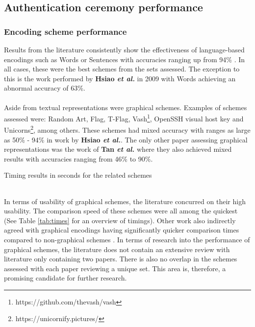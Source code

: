 \subsection{Authentication ceremony performance}

\subsubsection*{Encoding scheme performance}
Results 
from the literature consistently show the effectiveness of language-based encodings such as Words or Sentences with accuracies ranging up from 94\% \cite{dechand2016empirical}\cite{tan2017can}\cite{kainda2009usability}. In all cases, these were the best schemes from the sets assessed. The exception to this is the work performed by \textbf{Hsiao \textit{et al.}}\cite{hsiao2009study} in 2009 with Words achieving an abnormal accuracy of 63\%.
\\\\
Aside from textual representations were graphical schemes. Examples of schemes assessed were: Random Art\cite{perrig1999hash}, Flag\cite{ellison2003public}, T-Flag\cite{lin2010spate}, Vash\footnote{https://github.com/thevash/vash}, OpenSSH visual host key and Unicorns\footnote{https://unicornify.pictures/}, among others. These schemes had mixed accuracy with ranges as large as 50\% - 94\% in work by \textbf{Hsiao \textit{et al.}}\cite{hsiao2009study}. The only other paper assessing graphical representations was the work of \textbf{Tan \textit{et al.}}\cite{tan2017can} where they also achieved mixed results with accuracies ranging from 46\% to 90\%.
\\
\begin{table}[h!]
    \makebox[\textwidth][c]{
        
    }%
    \caption{Timing results in seconds for the related schemes}
    \label{tab:times}
\end{table}
\\
In terms of usability of graphical schemes, the literature concurred on their high usability. The comparison speed of these schemes were all among the quickest (See Table \ref{tab:times} for an overview of timings). Other work also indirectly agreed with graphical encodings having significantly quicker comparison times compared to non-graphical schemes \cite{dechand2016empirical}\cite{kainda2009usability}.
In terms of research into the performance of graphical schemes, the literature does not contain an extensive review with literature only containing two papers. There is also no overlap in the schemes assessed with each paper reviewing a unique set. This area is, therefore, a promising candidate for further research.

